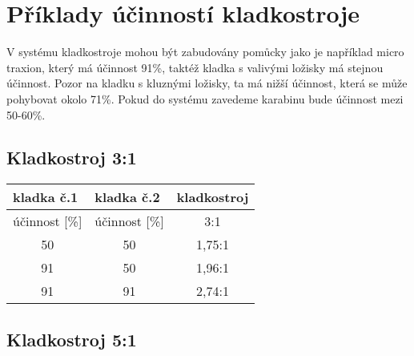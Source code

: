 \chapter{Příklady účinností kladkostroje}
\label{Souhrn}
\def\figurename{Obr.} %
\def\tablename{Tab.} %
\def\figureautorefname{obr.} %
\def\tableautorefname{tab.} %
\def\chapterautorefname{kapitola} %

V systému kladkostroje mohou být zabudovány pomůcky jako je například micro traxion, který má účinnost 91\%, taktéž kladka s valivými ložisky má stejnou účinnost. Pozor na kladku s kluznými ložisky, ta má nižší účinnost, která se může pohybovat okolo 71\%. Pokud do systému zavedeme karabinu bude účinnost mezi 50-60\%.


\section{Kladkostroj 3:1}

\begin{table}[h!] %
    \begin{tabular}{|c|c|c|}
        \hline
        \multicolumn{1}{|l|}{kladka č.1} & \multicolumn{1}{l|}{kladka č.2} & \multicolumn{1}{l|}{kladkostroj} \\ \hline
        {účinnost [}\%{]}                & {účinnost [}\%{]}               & 3:1                              \\ \hline
        50                               & 50                              & 1,75:1                           \\ \hline
        91                               & 50                              & 1,96:1                           \\ \hline
        91                               & 91                              & 2,74:1                           \\ \hline
    \end{tabular}
\end{table}

\section{Kladkostroj 5:1}


